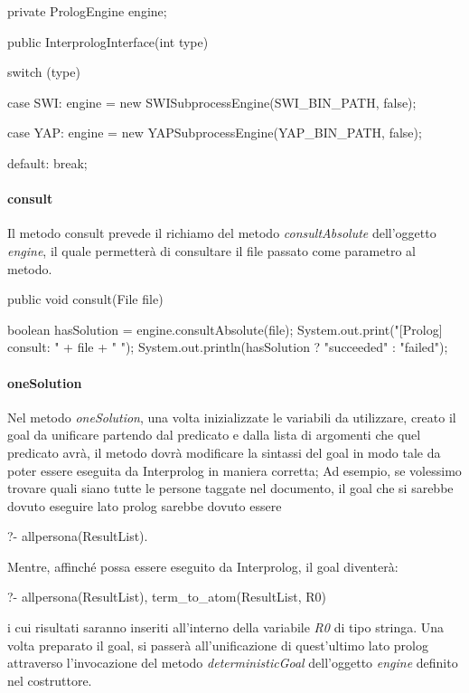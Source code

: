 \begin{javacode}
    private PrologEngine engine;

    public InterprologInterface(int type) {

        switch (type) {
            case SWI:
            engine = new SWISubprocessEngine(SWI_BIN_PATH, false);

            case YAP:
            engine = new YAPSubprocessEngine(YAP_BIN_PATH, false);

            default:
            break;
        }
    }
\end{javacode}
\paragraph{consult}
Il metodo consult prevede il richiamo del metodo \emph{consultAbsolute} dell'oggetto \emph{engine}, il quale permetterà di consultare il file passato come parametro al metodo.

\begin{javacode}
    public void consult(File file) {

        boolean hasSolution = engine.consultAbsolute(file);
        System.out.print("[Prolog] consult: " + file + " ");
        System.out.println(hasSolution ? "succeeded" : "failed");
    }
\end{javacode}
\paragraph{oneSolution}
Nel metodo \emph{oneSolution}, una volta inizializzate le variabili da utilizzare, creato il goal da unificare partendo dal predicato e dalla lista di argomenti che quel predicato avrà, il metodo dovrà modificare la sintassi del goal in modo tale da poter essere eseguita da Interprolog in maniera corretta; 
Ad esempio, se volessimo trovare quali siano tutte le persone taggate nel documento, il goal che si sarebbe dovuto eseguire lato prolog sarebbe dovuto essere

\begin{prologcode}
	?- allpersona(ResultList).
\end{prologcode}

Mentre, affinché possa essere eseguito da Interprolog, il goal diventerà:

\begin{prologcode}
	?- allpersona(ResultList), term_to_atom(ResultList, R0)
\end{prologcode}

i cui risultati saranno inseriti all'interno della variabile \emph{R0} di tipo stringa.
Una volta preparato il goal, si passerà all'unificazione di quest'ultimo lato prolog attraverso l'invocazione del metodo \emph{deterministicGoal} dell'oggetto \emph{engine} definito nel costruttore.

